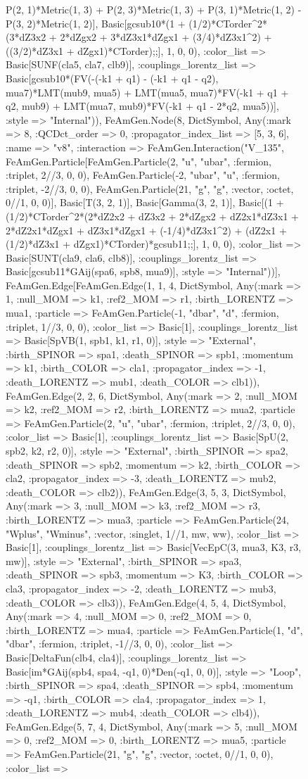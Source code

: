 \documentclass{revtex4}
\begin{document}
\begin{figure}[!htb]
\begin{center}
{P(2, 1)*Metric(1, 3) + P(2, 3)*Metric(1, 3) + P(3, 1)*Metric(1, 2) - P(3, 2)*Metric(1, 2)], Basic[gcsub10*(1 + (1/2)*CTorder^2*(3*dZ3x2 + 2*dZgx2 + 3*dZ3x1*dZgx1 + (3/4)*dZ3x1^2) + ((3/2)*dZ3x1 + dZgx1)*CTorder);;], 1, 0, 0), :color_list => Basic[SUNF(cla5, cla7, clb9)], :couplings_lorentz_list => Basic[gcsub10*(FV(-(-k1 + q1) - (-k1 + q1 - q2), mua7)*LMT(mub9, mua5) + LMT(mua5, mua7)*FV(-k1 + q1 + q2, mub9) + LMT(mua7, mub9)*FV(-k1 + q1 - 2*q2, mua5))], :style => "Internal")), FeAmGen.Node(8, Dict{Symbol, Any}(:mark => 8, :QCDct_order => 0, :propagator_index_list => [5, 3, 6], :name => "v8", :interaction => FeAmGen.Interaction("V_135", FeAmGen.Particle[FeAmGen.Particle(2, "u", "ubar", :fermion, :triplet, 2//3, 0, 0), FeAmGen.Particle(-2, "ubar", "u", :fermion, :triplet, -2//3, 0, 0), FeAmGen.Particle(21, "g", "g", :vector, :octet, 0//1, 0, 0)], Basic[T(3, 2, 1)], Basic[Gamma(3, 2, 1)], Basic[(1 + (1/2)*CTorder^2*(2*dZ2x2 + dZ3x2 + 2*dZgx2 + dZ2x1*dZ3x1 + 2*dZ2x1*dZgx1 + dZ3x1*dZgx1 + (-1/4)*dZ3x1^2) + (dZ2x1 + (1/2)*dZ3x1 + dZgx1)*CTorder)*gcsub11;;], 1, 0, 0), :color_list => Basic[SUNT(cla9, cla6, clb8)], :couplings_lorentz_list => Basic[gcsub11*GAij(spa6, spb8, mua9)], :style => "Internal"))], FeAmGen.Edge[FeAmGen.Edge(1, 1, 4, Dict{Symbol, Any}(:mark => 1, :null_MOM => k1, :ref2_MOM => r1, :birth_LORENTZ => mua1, :particle => FeAmGen.Particle(-1, "dbar", "d", :fermion, :triplet, 1//3, 0, 0), :color_list => Basic[1], :couplings_lorentz_list => Basic[SpVB(1, spb1, k1, r1, 0)], :style => "External", :birth_SPINOR => spa1, :death_SPINOR => spb1, :momentum => k1, :birth_COLOR => cla1, :propagator_index => -1, :death_LORENTZ => mub1, :death_COLOR => clb1)), FeAmGen.Edge(2, 2, 6, Dict{Symbol, Any}(:mark => 2, :null_MOM => k2, :ref2_MOM => r2, :birth_LORENTZ => mua2, :particle => FeAmGen.Particle(2, "u", "ubar", :fermion, :triplet, 2//3, 0, 0), :color_list => Basic[1], :couplings_lorentz_list => Basic[SpU(2, spb2, k2, r2, 0)], :style => "External", :birth_SPINOR => spa2, :death_SPINOR => spb2, :momentum => k2, :birth_COLOR => cla2, :propagator_index => -3, :death_LORENTZ => mub2, :death_COLOR => clb2)), FeAmGen.Edge(3, 5, 3, Dict{Symbol, Any}(:mark => 3, :null_MOM => k3, :ref2_MOM => r3, :birth_LORENTZ => mua3, :particle => FeAmGen.Particle(24, "Wplus", "Wminus", :vector, :singlet, 1//1, mw, ww), :color_list => Basic[1], :couplings_lorentz_list => Basic[VecEpC(3, mua3, K3, r3, mw)], :style => "External", :birth_SPINOR => spa3, :death_SPINOR => spb3, :momentum => K3, :birth_COLOR => cla3, :propagator_index => -2, :death_LORENTZ => mub3, :death_COLOR => clb3)), FeAmGen.Edge(4, 5, 4, Dict{Symbol, Any}(:mark => 4, :null_MOM => 0, :ref2_MOM => 0, :birth_LORENTZ => mua4, :particle => FeAmGen.Particle(1, "d", "dbar", :fermion, :triplet, -1//3, 0, 0), :color_list => Basic[DeltaFun(clb4, cla4)], :couplings_lorentz_list => Basic[im*GAij(spb4, spa4, -q1, 0)*Den(-q1, 0, 0)], :style => "Loop", :birth_SPINOR => spa4, :death_SPINOR => spb4, :momentum => -q1, :birth_COLOR => cla4, :propagator_index => 1, :death_LORENTZ => mub4, :death_COLOR => clb4)), FeAmGen.Edge(5, 7, 4, Dict{Symbol, Any}(:mark => 5, :null_MOM => 0, :ref2_MOM => 0, :birth_LORENTZ => mua5, :particle => FeAmGen.Particle(21, "g", "g", :vector, :octet, 0//1, 0, 0), :color_list => }
\end{center}
\end{figure}
\end{document}
